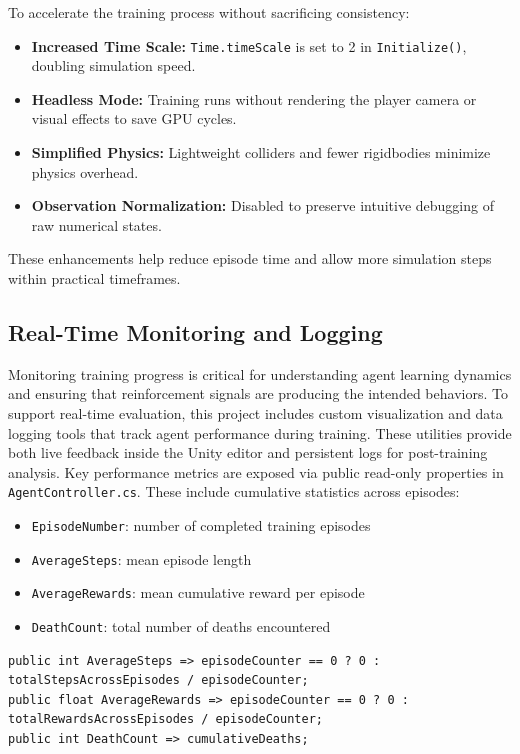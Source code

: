 \documentclass[12pt,oneside,openright,a4paper]{cpe-english-project}
\begin{document}
To accelerate the training process without sacrificing consistency:

\begin{itemize}
\item \textbf{Increased Time Scale:} \texttt{Time.timeScale} is set to 2 in \texttt{Initialize()}, doubling simulation speed.
\item \textbf{Headless Mode:} Training runs without rendering the player camera or visual effects to save GPU cycles.
\item \textbf{Simplified Physics:} Lightweight colliders and fewer rigidbodies minimize physics overhead.
\item \textbf{Observation Normalization:} Disabled to preserve intuitive debugging of raw numerical states.
\end{itemize}

These enhancements help reduce episode time and allow more simulation steps within practical timeframes.

\subsection{Real-Time Monitoring and Logging}
Monitoring training progress is critical for understanding agent learning dynamics and ensuring that reinforcement signals are producing the intended behaviors. To support real-time evaluation, this project includes custom visualization and data logging tools that track agent performance during training. These utilities provide both live feedback inside the Unity editor and persistent logs for post-training analysis.
Key performance metrics are exposed via public read-only properties in \texttt{AgentController.cs}. These include cumulative statistics across episodes:

\begin{itemize}
\item \texttt{EpisodeNumber}: number of completed training episodes
\item \texttt{AverageSteps}: mean episode length
\item \texttt{AverageRewards}: mean cumulative reward per episode
\item \texttt{DeathCount}: total number of deaths encountered
\end{itemize}

\begin{lstlisting}[language={[Sharp]C}]
public int AverageSteps => episodeCounter == 0 ? 0 : totalStepsAcrossEpisodes / episodeCounter;
public float AverageRewards => episodeCounter == 0 ? 0 : totalRewardsAcrossEpisodes / episodeCounter;
public int DeathCount => cumulativeDeaths;
\end{lstlisting}
\end{document}

